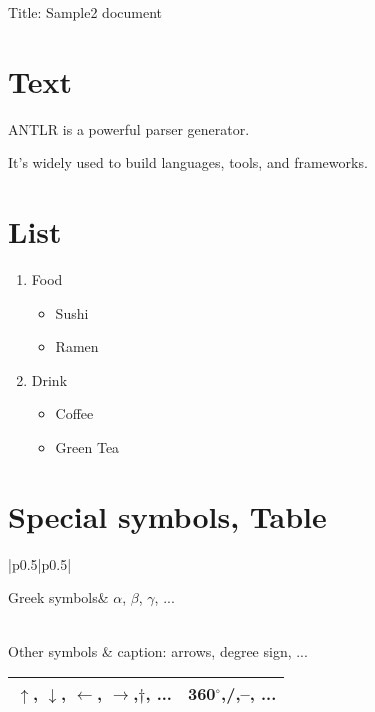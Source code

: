 \documentclass[pdflatex, a4paper, 10pt, jadriver=standard]{bxjsarticle}
\begin{document}
    
        {\Large Title: Sample2 document}\newline\newline
    
\section*{\Large Text}
	ANTLR is a powerful parser generator.
	\par
It's widely used to build languages, tools, and frameworks.
	
\par
\section*{\Large List}
    
\begin{enumerate}
     \item Food
		 
\begin{itemize}
			  \item Sushi
			  
\item Ramen
		
\end{itemize}
     
\item Drink
		 
\begin{itemize}
			  \item Coffee
			  
\item Green Tea
		
\end{itemize}
    
\end{enumerate}
	
	
\section*{\Large Special symbols, Table}
\begin{tabular}{|p{}|p{}|}\hline 
		
			Greek symbols&
			$\alpha$, $\beta$, $\gamma$, ...
		
\\\hline 
			Other symbols
			&
caption: arrows, degree sign, ...\newline 
\begin{tabular}{|p{}|p{}|}\hline 
				
				
					$\uparrow$, $\downarrow$, $\leftarrow$, $\rightarrow$,$\dagger$, ...
					&
360$^\circ$,/,--, ...
			
\\\hline 
\end{tabular}
        
\\\hline 
	\end{tabular}
\newline
	
\end{document}
